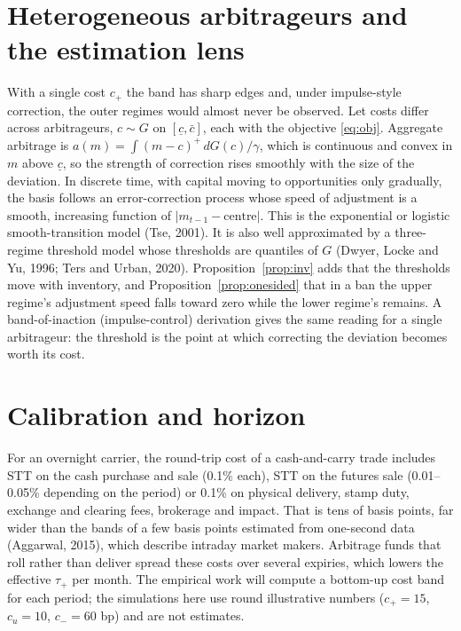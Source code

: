 \documentclass[11pt,a4paper]{article}
\theoremstyle{plain}
\theoremstyle{definition}
\theoremstyle{remark}
\begin{document}
\section{Heterogeneous arbitrageurs and the estimation lens}\label{sec:het}
With a single cost $c_+$ the band has sharp edges and, under impulse-style correction, the outer regimes would almost never
be observed. Let costs differ across arbitrageurs, $c\sim G$ on $[\underline c,\bar c]$, each with the objective
\eqref{eq:obj}. Aggregate arbitrage is $a(m)=\int (m-c)^+\,dG(c)/\gamma$, which is continuous and convex in $m$ above
$\underline c$, so the strength of correction rises smoothly with the size of the deviation. In discrete time, with capital
moving to opportunities only gradually, the basis follows an error-correction process whose speed of adjustment is a
smooth, increasing function of $|m_{t-1}-\text{centre}|$. This is the exponential or logistic smooth-transition model (Tse, 2001).
It is also well approximated by a three-regime threshold model whose thresholds are quantiles of $G$ (Dwyer, Locke and Yu,
1996; Ters and Urban, 2020). Proposition~\ref{prop:inv} adds that the thresholds move with inventory, and
Proposition~\ref{prop:onesided} that in a ban the upper regime's adjustment speed falls toward zero while the lower regime's
remains. A band-of-inaction (impulse-control) derivation gives the same reading for a single arbitrageur: the threshold is
the point at which correcting the deviation becomes worth its cost.

\section{Calibration and horizon}\label{sec:cal}
For an overnight carrier, the round-trip cost of a cash-and-carry trade includes STT on the cash purchase and sale
(0.1\% each), STT on the futures sale (0.01--0.05\% depending on the period) or 0.1\% on physical delivery, stamp duty,
exchange and clearing fees, brokerage and impact. That is tens of basis points, far wider than the bands of a few
basis points estimated from one-second data (Aggarwal, 2015), which describe intraday market makers. Arbitrage funds that roll rather than deliver spread these costs over several expiries, which
lowers the effective $\tau_+$ per month. The empirical work will compute a bottom-up cost band for each period; the simulations here
use round illustrative numbers ($c_+=15$, $c_u=10$, $c_-=60$ bp) and are not estimates.
\end{document}
